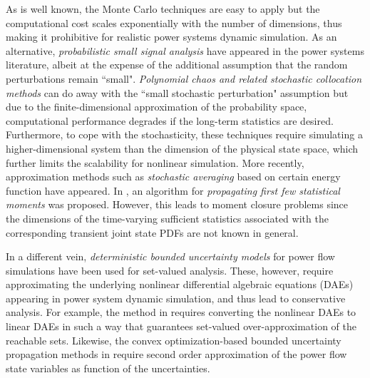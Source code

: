 \documentclass[10pt,twocolumn]{IEEEtran}
\begin{document}
 As is well known, the Monte Carlo techniques are easy to apply but the computational cost scales exponentially with the number of dimensions, thus making it prohibitive for realistic power systems dynamic simulation. As an alternative, \emph{probabilistic small signal analysis} \cite{nwankpa1992stochastic,rueda2009assessment,huang2013quasi,dhople2013analysis} have appeared in the power systems literature, albeit at the expense of the additional assumption that the random perturbations remain ``small". \emph{Polynomial chaos and related stochastic collocation methods} \cite{hockenberry2004evaluation,xu2019propagating} can do away with the ``small stochastic perturbation" assumption but due to the finite-dimensional approximation of the probability space, computational performance degrades if the long-term statistics are desired. Furthermore, to cope with the stochasticity, these techniques require simulating a higher-dimensional system than the dimension of the physical state space, which further limits the scalability for nonlinear simulation. More recently, approximation methods such as \emph{stochastic averaging} \cite{ju2018analytical,ju2018stochastic} based on certain energy function \cite{pai1989energy,chang1995direct,sauerpai1998} have appeared. In \cite{maldonado2018uncertainty}, an algorithm for \emph{propagating first few statistical moments} was proposed. However, this leads to moment closure problems since the dimensions of the time-varying sufficient statistics associated with the corresponding transient joint state PDFs are not known in general. 

In a different vein, \emph{deterministic bounded uncertainty models} for power flow simulations have been used \cite{dimitrovski2004boundary,hiskens2006sensitivity,chen2012method,althoff2014formal} for set-valued analysis. These, however, require approximating the underlying nonlinear differential algebraic equations (DAEs) appearing in power system dynamic simulation, and thus lead to conservative analysis. For example, the method in \cite{althoff2014formal} requires converting the nonlinear DAEs to linear DAEs in such a way that guarantees set-valued over-approximation of the reachable sets. Likewise, the convex optimization-based bounded uncertainty propagation methods in \cite{choi2017propagating,choi2018propagating} require second order approximation of the power flow state variables as function of the uncertainties.
\end{document}
